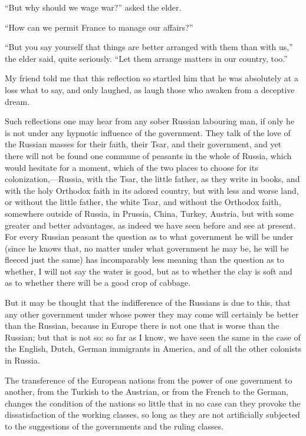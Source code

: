 \documentclass{book}
\begin{document}
“But why should we wage war?” asked the elder.

“How can we permit France to manage our affairs?”

“But you say yourself that things are better arranged with them than with us,” the elder said, quite seriously. “Let them arrange matters in our country, too.”

My friend told me that this reflection so startled him that he was absolutely at a loss what to say, and only laughed, as laugh those who awaken from a deceptive dream.

Such reflections one may hear from any sober Russian labouring man, if only he is not under any hypnotic influence of the government. They talk of the love of the Russian masses for their faith, their Tsar, and their government, and yet there will not be found one commune of peasants in the whole of Russia, which would hesitate for a moment, which of the two places to choose for its colonization,—Russia, with the Tsar, the little father, as they write in books, and with the holy Orthodox faith in its adored country, but with less and worse land, or without the little father, the white Tsar, and without the Orthodox faith, somewhere outside of Russia, in Prussia, China, Turkey, Austria, but with some greater and better advantages, as indeed we have seen before and see at present. For every Russian peasant the question as to what government he will be under (since he knows that, no matter under what government he may be, he will be fleeced just the same) has incomparably less meaning than the question as to whether, I will not say the water is good, but as to whether the clay is soft and as to whether there will be a good crop of cabbage.

But it may be thought that the indifference of the Russians is due to this, that any other government under whose power they may come will certainly be better than the Russian, because in Europe there is not one that is worse than the Russian; but that is not so: so far as I know, we have seen the same in the case of the English, Dutch, German immigrants in America, and of all the other colonists in Russia.

The transference of the European nations from the power of one government to another, from the Turkish to the Austrian, or from the French to the German, changes the condition of the nations so little that in no case can they provoke the dissatisfaction of the working classes, so long as they are not artificially subjected to the suggestions of the governments and the ruling classes.
\end{document}
